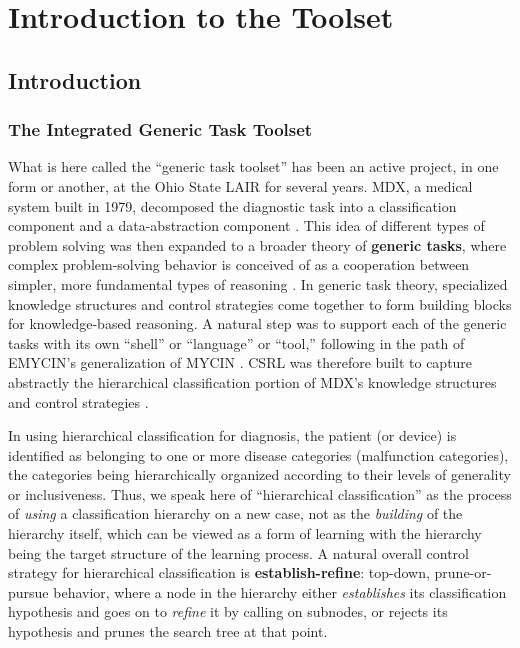 \part{Introduction to the Toolset}


\chapter{Introduction}



\section{The Integrated Generic Task Toolset}

What is here called the ``generic task toolset'' has been an active
project, in one form or another, at the Ohio State LAIR for several
years.  MDX, a medical system built in 1979, decomposed the diagnostic
task into a classification component \cite{84-FG-FGBC} and a
data-abstraction component \cite{MITT80C,83-BC-MDX}.  This idea of
different types of problem solving was then expanded to a broader
theory of {\bf generic tasks}, where complex problem-solving behavior
is conceived of as a cooperation between simpler, more fundamental
types of reasoning \cite{83-BC-TAXONO,86-BC-IEEEX,87-BC-IJCAI}.  In
generic task theory, specialized knowledge structures and control
strategies come together to form building blocks for knowledge-based
reasoning.  A natural step was to support each of the generic tasks
with its own ``shell'' or ``language'' or ``tool,'' following in the
path of EMYCIN's generalization of MYCIN \cite{VANM80}.  CSRL was
therefore built to capture abstractly the hierarchical classification
portion of MDX's knowledge structures and control strategies
\cite{86-TB-CSRL}.

In using hierarchical classification for diagnosis, the patient (or
device) is identified as belonging to one or more disease categories
(malfunction categories), the categories being hierarchically
organized according to their levels of generality or inclusiveness.
Thus, we speak here of ``hierarchical classification'' as the process
of {\em using\/} a classification hierarchy on a new case, not as the
{\em building\/} of the hierarchy itself, which can be viewed as a
form of learning with the hierarchy being the target structure of the
learning process.  A natural overall control strategy for hierarchical
classification is {\bf establish-refine}: top-down, prune-or-pursue
behavior, where a node in the hierarchy either {\em establishes\/} its
classification hypothesis and goes on to {\em refine\/} it by calling
on subnodes, or rejects its hypothesis and prunes the search tree at
that point.

